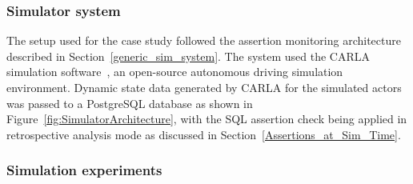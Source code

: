 \subsubsection{Simulator system}

The setup used for the case study followed the assertion monitoring architecture described in Section~\ref{generic_sim_system}. 
%
The system used the CARLA simulation software~\cite{CarlaSimulator}, an open-source autonomous driving simulation environment. Dynamic state data generated by CARLA for the simulated actors was passed to a PostgreSQL database as shown in Figure~\ref{fig:SimulatorArchitecture}, with the SQL assertion check being applied in retrospective analysis mode as discussed in Section~\ref{Assertions_at_Sim_Time}.
%






\subsubsection{Simulation experiments}

